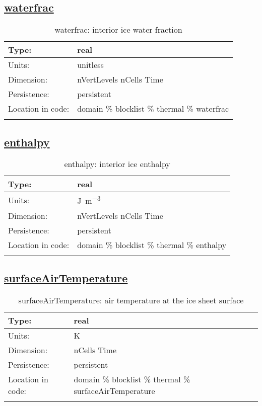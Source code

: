 \subsection[waterfrac]{\hyperref[sec:var_tab_thermal]{waterfrac}}
\label{subsec:var_sec_thermal_waterfrac}
\begin{center}
\begin{longtable}{| p{2.0in} | p{4.0in} |}
        \hline 
        Type: & real \\
        \hline 
        Units: & \si{unitless} \\
        \hline 
        Dimension: & nVertLevels nCells Time \\
        \hline 
        Persistence: & persistent \\
        \hline 
         Location in code: & domain \% blocklist \% thermal \% waterfrac \\
         \hline 
    \caption{waterfrac: interior ice water fraction}
\end{longtable}
\end{center}
\subsection[enthalpy]{\hyperref[sec:var_tab_thermal]{enthalpy}}
\label{subsec:var_sec_thermal_enthalpy}
\begin{center}
\begin{longtable}{| p{2.0in} | p{4.0in} |}
        \hline 
        Type: & real \\
        \hline 
        Units: & \si{J.m^{-3}} \\
        \hline 
        Dimension: & nVertLevels nCells Time \\
        \hline 
        Persistence: & persistent \\
        \hline 
         Location in code: & domain \% blocklist \% thermal \% enthalpy \\
         \hline 
    \caption{enthalpy: interior ice enthalpy}
\end{longtable}
\end{center}
\subsection[surfaceAirTemperature]{\hyperref[sec:var_tab_thermal]{surfaceAirTemperature}}
\label{subsec:var_sec_thermal_surfaceAirTemperature}
\begin{center}
\begin{longtable}{| p{2.0in} | p{4.0in} |}
        \hline 
        Type: & real \\
        \hline 
        Units: & \si{K} \\
        \hline 
        Dimension: & nCells Time \\
        \hline 
        Persistence: & persistent \\
        \hline 
         Location in code: & domain \% blocklist \% thermal \% surfaceAirTemperature \\
         \hline 
    \caption{surfaceAirTemperature: air temperature at the ice sheet surface}
\end{longtable}
\end{center}
